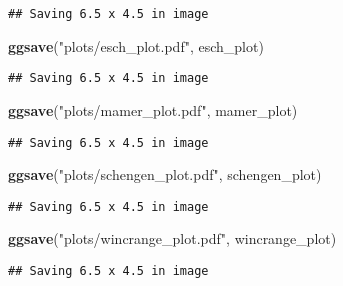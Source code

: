 \documentclass[
]{article}
\newenvironment{Shaded}{\begin{snugshade}}{\end{snugshade}}
\newcommand{\FunctionTok}[1]{\textcolor[rgb]{0.13,0.29,0.53}{\textbf{#1}}}
\newcommand{\NormalTok}[1]{#1}
\newcommand{\StringTok}[1]{\textcolor[rgb]{0.31,0.60,0.02}{#1}}
\begin{document}
\begin{verbatim}
## Saving 6.5 x 4.5 in image
\end{verbatim}

\begin{Shaded}
\begin{Highlighting}[]
\FunctionTok{ggsave}\NormalTok{(}\StringTok{"plots/esch\_plot.pdf"}\NormalTok{, esch\_plot)}
\end{Highlighting}
\end{Shaded}

\begin{verbatim}
## Saving 6.5 x 4.5 in image
\end{verbatim}

\begin{Shaded}
\begin{Highlighting}[]
\FunctionTok{ggsave}\NormalTok{(}\StringTok{"plots/mamer\_plot.pdf"}\NormalTok{, mamer\_plot)}
\end{Highlighting}
\end{Shaded}

\begin{verbatim}
## Saving 6.5 x 4.5 in image
\end{verbatim}

\begin{Shaded}
\begin{Highlighting}[]
\FunctionTok{ggsave}\NormalTok{(}\StringTok{"plots/schengen\_plot.pdf"}\NormalTok{, schengen\_plot)}
\end{Highlighting}
\end{Shaded}

\begin{verbatim}
## Saving 6.5 x 4.5 in image
\end{verbatim}

\begin{Shaded}
\begin{Highlighting}[]
\FunctionTok{ggsave}\NormalTok{(}\StringTok{"plots/wincrange\_plot.pdf"}\NormalTok{, wincrange\_plot)}
\end{Highlighting}
\end{Shaded}

\begin{verbatim}
## Saving 6.5 x 4.5 in image
\end{verbatim}
\end{document}

